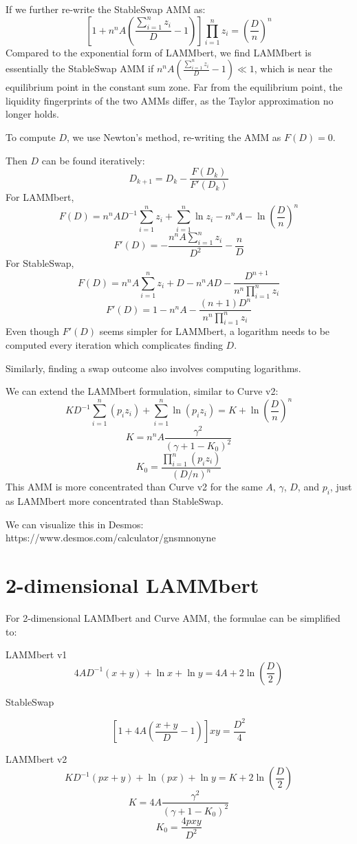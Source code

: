 \documentclass{article}
\begin{document}
If we further re-write the StableSwap AMM as:
$$\left[1+n^nA\left(\frac{\sum_{i=1}^n z_i}{D}-1\right)\right]\prod_{i=1}^n z_i=\left(\frac{D}{n}\right)^n$$
Compared to the exponential form of LAMMbert, we find LAMMbert is essentially the StableSwap AMM if $n^nA\left(\frac{\sum_{i=1}^n z_i}{D}-1\right)\ll1$, which is near the equilibrium point in the constant sum zone. Far from the equilibrium point, the liquidity fingerprints of the two AMMs differ, as the Taylor approximation no longer holds.

To compute $D$, we use Newton’s method, re-writing the AMM as $F(D)=0$.

Then $D$ can be found iteratively:
$$D_{k+1}=D_k-\frac{F(D_k)}{F'(D_k)}$$
For LAMMbert,
$$F(D)=n^nAD^{-1}\sum_{i=1}^nz_i+\sum_{i=1}^n\ln z_{i}-n^nA-\ln\left(\frac{D}{n}\right)^n$$
$$F'(D)=-\frac{n^nA\sum_{i=1}^nz_i}{D^2}-\frac{n}{D}$$
For StableSwap,
$$F(D)=n^nA\sum_{i=1}^n z_i+D-n^nAD-\frac{D^{n+1}}{n^n\prod_{i=1}^nz_i}$$
$$F'(D)=1-n^nA-\frac{(n+1)D^n}{n^n\prod_{i=1}^nz_i}$$
Even though $F'(D)$ seems simpler for LAMMbert, a logarithm needs to be computed every iteration which complicates finding $D$.

Similarly, finding a swap outcome also involves computing logarithms.

We can extend the LAMMbert formulation, similar to Curve v2:
$$KD^{-1}\sum_{i=1}^n(p_iz_i)+\sum_{i=1}^n\ln (p_iz_{i})=K+\ln\left(\frac{D}{n}\right)^n$$
$$K=n^nA\frac{\gamma^2}{(\gamma+1-K_{0})^2}$$
$$K_{0}=\frac{\prod_{i=1}^{n}(p_{i}z_{i})}{(D/n)^{n}}$$
This AMM is more concentrated than Curve v2 for the same $A$, $\gamma$, $D$, and $p_i$, just as LAMMbert more concentrated than StableSwap.

We can visualize this in Desmos:
https://www.desmos.com/calculator/gnsmnonyne

\section{2-dimensional LAMMbert}
For 2-dimensional LAMMbert and Curve AMM, the formulae can be simplified to:

LAMMbert v1
$$4AD^{-1}(x+y)+\ln x+\ln y=4A+2\ln\left(\frac{D}{2}\right)$$

StableSwap

$$\left[1+4A\left(\frac{x+y}{D}-1\right)\right]xy=\frac{D^2}{4}$$

LAMMbert v2
$$KD^{-1}(px+y)+\ln (px)+\ln y=K+2\ln\left(\frac{D}{2}\right)$$
$$K=4A\frac{\gamma^2}{(\gamma+1-K_{0})^2}$$
$$K_{0}=\frac{4pxy}{D^2}$$
\end{document}
